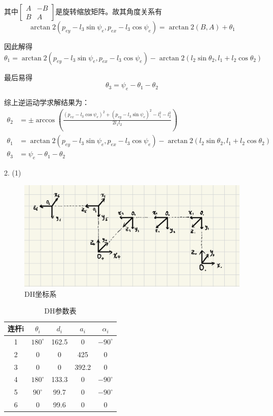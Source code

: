 \documentclass[UTF8, 12pt]{ctexart}
\begin{document}
其中\(\begin{bmatrix} A & -B \\ B & A \end{bmatrix}\)是旋转缩放矩阵。故其角度关系有
\[
\arctan2(p_{ey} - l_3 \sin\psi_e, p_{ex} - l_3 \cos\psi_e) = \arctan2(B, A) + \theta_1
\]

因此解得
\[
\theta_1 = \arctan2(p_{ey} - l_3 \sin\psi_e, p_{ex} - l_3 \cos\psi_e) - \arctan2(l_2 \sin\theta_2, l_1 + l_2 \cos\theta_2)
\]
\vspace{0.5em}

最后易得
\[
\theta_3 = \psi_e - \theta_1 - \theta_2
\]
\vspace{0.5em}

综上逆运动学求解结果为：
\[
\begin{aligned}
\theta_2 &= \pm \arccos\left(\frac{(p_{ex} - l_3 \cos\psi_e)^2 + (p_{ey} - l_3 \sin\psi_e)^2 - l_1^2 - l_2^2}{2l_1l_2}\right) \\
\theta_1 &= \arctan2(p_{ey} - l_3 \sin\psi_e, p_{ex} - l_3 \cos\psi_e) - \arctan2(l_2 \sin\theta_2, l_1 + l_2 \cos\theta_2) \\
\theta_3 &= \psi_e - \theta_1 - \theta_2
\end{aligned}
\]

\newpage


2.
(1)
\begin{figure}[h]
    \centering
    \includegraphics[width=1.0\textwidth]{asset/DH_coor.png}
    \caption{DH坐标系}
\end{figure}
\begin{table}[h]
    \centering
    \begin{tabular}{|c|c|c|c|c|}
        \hline
        连杆i & \(\theta_i\) & \(d_i\) & \(a_i\) & \(\alpha_i\) \\
        \hline
        1 & $180^\circ$ & 162.5 & 0 & $-90^\circ$ \\
        \hline
        2 & 0 & 0 & 425 & 0 \\
        \hline
        3 & 0 & 0 & 392.2 & 0 \\
        \hline
        4 & $180^\circ$ & 133.3 & 0 & $-90^\circ$ \\
        \hline
        5 & $90^\circ$ & 99.7 & 0 & $-90^\circ$ \\
        \hline
        6 & 0 & 99.6 & 0 & 0 \\
        \hline
    \end{tabular}
    \caption{DH参数表}
\end{table}
\vspace{5em}
\end{document}
